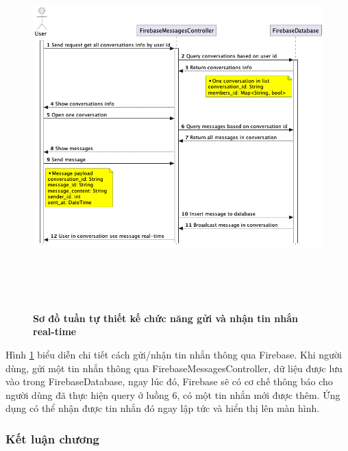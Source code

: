 \begin{figure}[H]
  \centering
  \includegraphics[width=16cm,height=14cm]{Images/mobile_app/design_send_receive_message.png}
  \caption[Sơ đồ tuần tự thiết kế chức năng gửi và nhận tin nhắn real-time]{\bfseries \fontsize{12pt}{0pt}
  \selectfont Sơ đồ tuần tự thiết kế chức năng gửi và nhận tin nhắn real-time}
  \label{design_send_receive_firebase_message} %
\end{figure}

Hình \ref{design_send_receive_firebase_message} biểu diễn chi tiết cách gửi/nhận tin nhắn thông qua Firebase. Khi người dùng,
gửi một tin nhắn thông qua FirebaseMessagesController, dữ liệu được lưu vào trong FirebaseDatabase, ngay lúc đó, Firebase sẽ có
cơ chế thông báo cho người dùng đã thực hiện query ở luồng 6, có một tin nhắn mới được thêm. Ứng dụng có thể nhận được tin nhắn
đó ngay lập tức và hiển thị lên màn hình.

\subsubsection{Kết luận chương}

\newpage